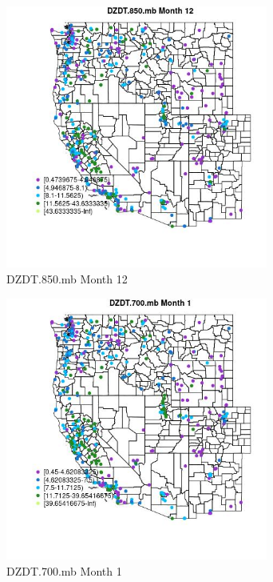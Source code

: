 \begin{figure} 
\centering  
\includegraphics[width=0.77\textwidth]{Code_Outputs/ML_input_report_ML_input_PM25_Step5_part_d_de_duplicated_aves_ML_input_MapObsMo12DZDT850mb.jpg} 
\caption{\label{fig:ML_input_report_ML_input_PM25_Step5_part_d_de_duplicated_aves_ML_inputMapObsMo12DZDT850mb}DZDT.850.mb Month 12} 
\end{figure} 
 

\begin{figure} 
\centering  
\includegraphics[width=0.77\textwidth]{Code_Outputs/ML_input_report_ML_input_PM25_Step5_part_d_de_duplicated_aves_ML_input_MapObsMo1DZDT700mb.jpg} 
\caption{\label{fig:ML_input_report_ML_input_PM25_Step5_part_d_de_duplicated_aves_ML_inputMapObsMo1DZDT700mb}DZDT.700.mb Month 1} 
\end{figure} 
 

